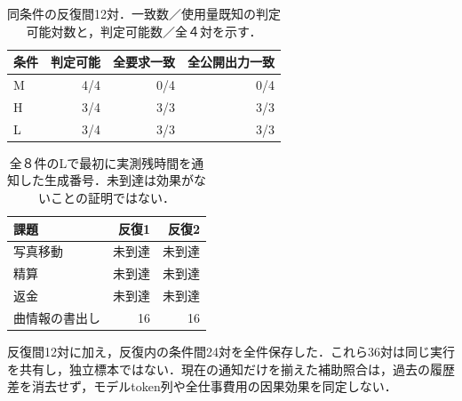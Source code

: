 \begin{table}[tb]
\centering\small\setlength{\tabcolsep}{4pt}
\caption{同条件の反復間12対．一致数／使用量既知の判定可能対数と，判定可能数／全４対を示す．}
\begin{tabular}{lrrr}
条件 & 判定可能 & 全要求一致 & 全公開出力一致 \\ \hline
M & 4/4 & 0/4 & 0/4 \\
H & 3/4 & 3/3 & 3/3 \\
L & 3/4 & 3/3 & 3/3 \\
\hline\end{tabular}
\end{table}
\begin{table}[tb]
\centering\small\setlength{\tabcolsep}{4pt}
\caption{全８件のLで最初に実測残時間を通知した生成番号．未到達は効果がないことの証明ではない．}
\begin{tabular}{lrr}
課題 & 反復1 & 反復2 \\ \hline
写真移動 & 未到達 & 未到達 \\
精算 & 未到達 & 未到達 \\
返金 & 未到達 & 未到達 \\
曲情報の書出し & 16 & 16 \\
\hline\end{tabular}
\end{table}
反復間12対に加え，反復内の条件間24対を全件保存した．これら36対は同じ実行を共有し，独立標本ではない．現在の通知だけを揃えた補助照合は，過去の履歴差を消去せず，モデルtoken列や全仕事費用の因果効果を同定しない．
